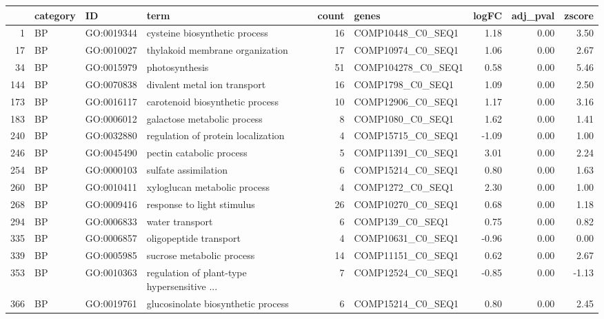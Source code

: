 \documentclass[10pt,oneside,a4paper]{article}
\begin{document}
\begin{table}[ht]
\begin{tabular}{rlllrlrrr}
  \hline
 & category & ID & term & count & genes & logFC & adj\_pval & zscore \\ 
  \hline
1 & BP & GO:0019344 & cysteine biosynthetic process &  16 & COMP10448\_C0\_SEQ1 & 1.18 & 0.00 & 3.50 \\ 
  17 & BP & GO:0010027 & thylakoid membrane organization &  17 & COMP10974\_C0\_SEQ1 & 1.06 & 0.00 & 2.67 \\ 
  34 & BP & GO:0015979 & photosynthesis &  51 & COMP104278\_C0\_SEQ1 & 0.58 & 0.00 & 5.46 \\ 
  144 & BP & GO:0070838 & divalent metal ion transport &  16 & COMP1798\_C0\_SEQ1 & 1.09 & 0.00 & 2.50 \\ 
  173 & BP & GO:0016117 & carotenoid biosynthetic process &  10 & COMP12906\_C0\_SEQ1 & 1.17 & 0.00 & 3.16 \\ 
  183 & BP & GO:0006012 & galactose metabolic process &   8 & COMP1080\_C0\_SEQ1 & 1.62 & 0.00 & 1.41 \\ 
  240 & BP & GO:0032880 & regulation of protein localization &   4 & COMP15715\_C0\_SEQ1 & -1.09 & 0.00 & 1.00 \\ 
  246 & BP & GO:0045490 & pectin catabolic process &   5 & COMP11391\_C0\_SEQ1 & 3.01 & 0.00 & 2.24 \\ 
  254 & BP & GO:0000103 & sulfate assimilation &   6 & COMP15214\_C0\_SEQ1 & 0.80 & 0.00 & 1.63 \\ 
  260 & BP & GO:0010411 & xyloglucan metabolic process &   4 & COMP1272\_C0\_SEQ1 & 2.30 & 0.00 & 1.00 \\ 
  268 & BP & GO:0009416 & response to light stimulus &  26 & COMP10270\_C0\_SEQ1 & 0.68 & 0.00 & 1.18 \\ 
  294 & BP & GO:0006833 & water transport &   6 & COMP139\_C0\_SEQ1 & 0.75 & 0.00 & 0.82 \\ 
  335 & BP & GO:0006857 & oligopeptide transport &   4 & COMP10631\_C0\_SEQ1 & -0.96 & 0.00 & 0.00 \\ 
  339 & BP & GO:0005985 & sucrose metabolic process &  14 & COMP11151\_C0\_SEQ1 & 0.62 & 0.00 & 2.67 \\ 
  353 & BP & GO:0010363 & regulation of plant-type hypersensitive ... &   7 & COMP12524\_C0\_SEQ1 & -0.85 & 0.00 & -1.13 \\ 
  366 & BP & GO:0019761 & glucosinolate biosynthetic process &   6 & COMP15214\_C0\_SEQ1 & 0.80 & 0.00 & 2.45 \\ 

\end{tabular}
\end{table}
\end{document}
